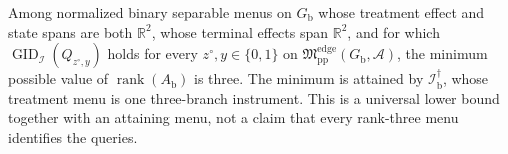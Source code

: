 Among normalized binary separable menus on \(G_{\mathrm b}\) whose treatment
effect and state spans are both \(\mathbb R^2\), whose terminal effects span
\(\mathbb R^2\), and for which
\(\operatorname{GID}_{\mathcal I}(Q_{z^{\circ},y})\) holds for every
\(z^{\circ},y\in\{0,1\}\) on
\(\mathfrak M_{\mathrm{pp}}^{\mathrm{edge}}(G_{\mathrm b},\mathcal A)\),
the minimum possible value of \(\operatorname{rank}(A_{\mathrm b})\) is
three.  The minimum is attained by \(\mathcal I_{\mathrm b}^{\dagger}\),
whose treatment menu is one three-branch instrument.  This is a universal
lower bound together with an attaining menu, not a claim that every
rank-three menu identifies the queries.